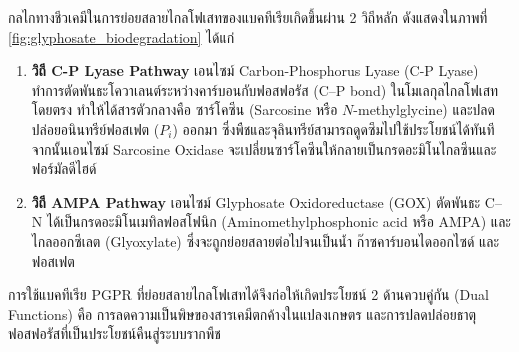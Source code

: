 กลไกทางชีวเคมีในการย่อยสลายไกลโฟเสทของแบคทีเรียเกิดขึ้นผ่าน 2 วิถีหลัก ดังแสดงในภาพที่ \ref{fig:glyphosate_biodegradation} ได้แก่
\begin{enumerate}
    \item \textbf{วิถี C-P Lyase Pathway} เอนไซม์ Carbon-Phosphorus Lyase (C-P Lyase) ทำการตัดพันธะโควาเลนต์ระหว่างคาร์บอนกับฟอสฟอรัส (C--P bond) ในโมเลกุลไกลโฟเสทโดยตรง ทำให้ได้สารตัวกลางคือ ซาร์โคซีน (Sarcosine หรือ $N$-methylglycine) และปลดปล่อยอนินทรีย์ฟอสเฟต ($P_i$) ออกมา ซึ่งพืชและจุลินทรีย์สามารถดูดซึมไปใช้ประโยชน์ได้ทันที จากนั้นเอนไซม์ Sarcosine Oxidase จะเปลี่ยนซาร์โคซีนให้กลายเป็นกรดอะมิโนไกลซีนและฟอร์มัลดีไฮด์
    \item \textbf{วิถี AMPA Pathway} เอนไซม์ Glyphosate Oxidoreductase (GOX) ตัดพันธะ C--N ได้เป็นกรดอะมิโนเมทิลฟอสโฟนิก (Aminomethylphosphonic acid หรือ AMPA) และไกลออกซีเลต (Glyoxylate) ซึ่งจะถูกย่อยสลายต่อไปจนเป็นน้ำ ก๊าซคาร์บอนไดออกไซด์ และฟอสเฟต
\end{enumerate}

การใช้แบคทีเรีย PGPR ที่ย่อยสลายไกลโฟเสทได้จึงก่อให้เกิดประโยชน์ 2 ด้านควบคู่กัน (Dual Functions) คือ การลดความเป็นพิษของสารเคมีตกค้างในแปลงเกษตร และการปลดปล่อยธาตุฟอสฟอรัสที่เป็นประโยชน์คืนสู่ระบบรากพืช


